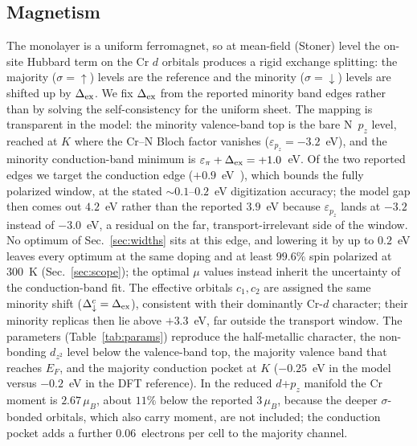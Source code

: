 \documentclass[preprint,12pt]{elsarticle}
\begin{document}
\subsection{Magnetism}
The monolayer is a uniform ferromagnet, so at mean-field (Stoner) level the on-site Hubbard term
on the Cr $d$ orbitals produces a rigid exchange splitting: the majority ($\sigma=\uparrow$)
levels are the reference and the minority ($\sigma=\downarrow$) levels are shifted up by
$\Delta_{\rm ex}$. We fix $\Delta_{\rm ex}$ from the reported minority band edges rather than
by solving the self-consistency for the uniform sheet. The mapping is transparent in the
model: the minority valence-band top is the bare N~$p_z$ level, reached at $K$ where the Cr--N
Bloch factor vanishes ($\varepsilon_{p_z}=-3.2$~eV), and the minority conduction-band minimum
is $\varepsilon_\pi+\Delta_{\rm ex}=+1.0$~eV. Of the two reported edges we target the
conduction edge ($+0.9$~eV~\cite{Kuklin2017}), which bounds the fully polarized window, at
the stated $\sim$$0.1$--$0.2$~eV digitization accuracy; the model gap then comes
out $4.2$~eV rather than the reported $3.9$~eV because $\varepsilon_{p_z}$ lands at $-3.2$
instead of $-3.0$~eV, a residual on the far, transport-irrelevant side of the window. No
optimum of Sec.~\ref{sec:widths} sits at this edge, and lowering it by up to $0.2$~eV leaves
every optimum at the same doping and at least $99.6\%$ spin polarized at $300$~K
(Sec.~\ref{sec:scope}); the optimal $\mu$ values instead inherit the uncertainty of the
conduction-band fit. The
effective orbitals $c_1,c_2$ are assigned the same minority shift
($\Delta^c_\downarrow=\Delta_{\rm ex}$), consistent with their dominantly Cr-$d$ character;
their minority replicas then lie above $+3.3$~eV, far outside the transport window. The parameters
(Table~\ref{tab:params}) reproduce the half-metallic character, the non-bonding $d_{z^2}$
level below the valence-band top, the majority valence band that reaches $E_F$, and the
majority conduction pocket at $K$ ($-0.25$~eV in the model versus $-0.2$~eV in the DFT
reference). In the reduced $d$+$p_z$ manifold the Cr moment is $2.67\,\mu_B$, about $11\%$
below the reported $3\,\mu_B$, because the deeper $\sigma$-bonded orbitals, which also carry
moment, are not included; the conduction pocket adds a further $0.06$~electrons per cell to
the majority channel.
\end{document}
